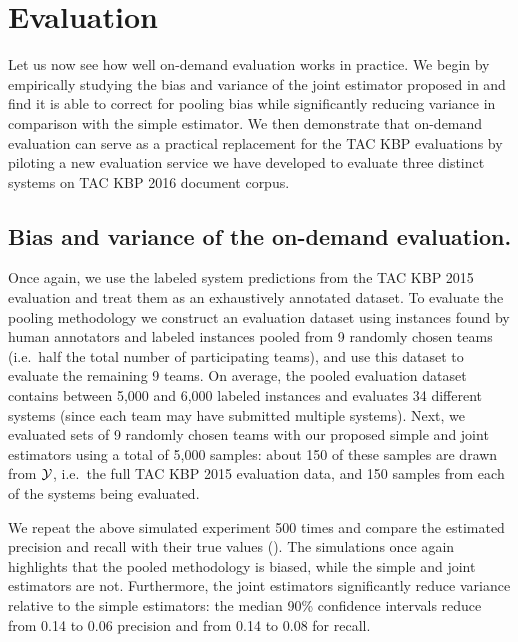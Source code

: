 
\section{Evaluation}
\label{sec:evaluation}

Let us now see how well on-demand evaluation works in practice.
We begin by empirically studying the bias and variance of the joint estimator proposed in  and find it is able to correct for pooling bias while significantly reducing variance in comparison with the simple estimator.
We then demonstrate that on-demand evaluation can serve as a practical replacement for the TAC KBP evaluations by piloting a new evaluation service we have developed to evaluate three distinct systems on TAC KBP 2016 document corpus.

\subsection{Bias and variance of the on-demand evaluation.}
Once again, we use the labeled system predictions from the TAC KBP 2015 evaluation and treat them as an exhaustively annotated dataset.
To evaluate the pooling methodology we construct an evaluation dataset using
instances found by human annotators and labeled instances pooled from 9
randomly chosen teams (i.e.\ half the total number of participating teams), and
use this dataset to evaluate the remaining 9 teams.
On average, the pooled evaluation dataset contains between 5,000 and 6,000 labeled instances and evaluates 34 different systems (since each team may have submitted multiple systems).
Next, we evaluated sets of 9 randomly chosen teams with our proposed simple and joint estimators using a total of 5,000 samples:
about 150 of these samples are drawn from $\mathcal{Y}$, i.e.\ the full TAC KBP 2015 evaluation data, and 150 samples from each of the systems being evaluated.

We repeat the above simulated experiment 500 times and compare the estimated precision and recall with their true values ().
The simulations once again highlights that the pooled methodology is biased, while the simple and joint estimators are not.
Furthermore, the joint estimators significantly reduce variance relative to the simple estimators:
the median 90\% confidence intervals reduce from 0.14 to 0.06 precision and from 0.14 to 0.08 for recall.

